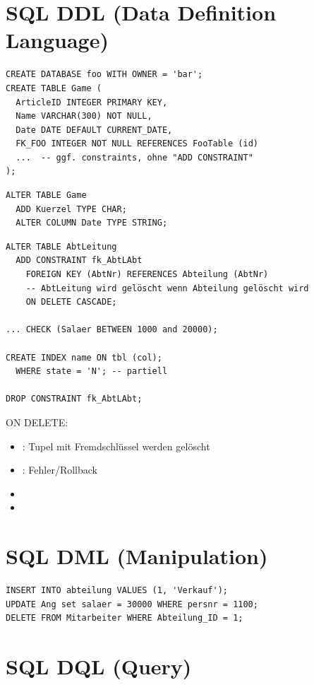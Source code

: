 \begin{multicols*}{3}
\section{SQL DDL (Data Definition Language)}

\begin{verbatim}
CREATE DATABASE foo WITH OWNER = 'bar';
CREATE TABLE Game (
  ArticleID INTEGER PRIMARY KEY,
  Name VARCHAR(300) NOT NULL,
  Date DATE DEFAULT CURRENT_DATE,
  FK_FOO INTEGER NOT NULL REFERENCES FooTable (id)
  ...  -- ggf. constraints, ohne "ADD CONSTRAINT"
);
\end{verbatim}

\begin{verbatim}
ALTER TABLE Game
  ADD Kuerzel TYPE CHAR;
  ALTER COLUMN Date TYPE STRING;
\end{verbatim}

\begin{verbatim}
ALTER TABLE AbtLeitung
  ADD CONSTRAINT fk_AbtLAbt
    FOREIGN KEY (AbtNr) REFERENCES Abteilung (AbtNr)
    -- AbtLeitung wird gelöscht wenn Abteilung gelöscht wird
    ON DELETE CASCADE;

... CHECK (Salaer BETWEEN 1000 and 20000);

CREATE INDEX name ON tbl (col);
  WHERE state = 'N'; -- partiell

DROP CONSTRAINT fk_AbtLAbt;
\end{verbatim}

ON DELETE:

\begin{itemize}
  \item {}: Tupel mit Fremdschlüssel werden gelöscht
  \item {}: Fehler/Rollback
  \item {}
  \item {}
\end{itemize}

\section{SQL DML (Manipulation)}
\begin{verbatim}
INSERT INTO abteilung VALUES (1, 'Verkauf');
UPDATE Ang set salaer = 30000 WHERE persnr = 1100;
DELETE FROM Mitarbeiter WHERE Abteilung_ID = 1;
\end{verbatim}

\section{SQL DQL (Query)}


\end{multicols*}
